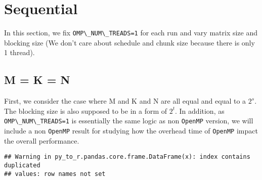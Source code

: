 \documentclass[
  12pt,
  xcolor = usenames,dvipsnames]{article}
\newcommand{\passthrough}[1]{#1}
\begin{document}
\begin{table}[!h]
\centering
{}
\end{table}

\hypertarget{sequential}{%
\section{Sequential}\label{sequential}}

In this section, we fix \passthrough{\lstinline!OMP\_NUM\_TREADS=1!} for each run and vary matrix size and blocking size (We don't care about schedule and chunk size because there is only 1 thread).

\hypertarget{m-k-n}{%
\subsection{M = K = N}\label{m-k-n}}

First, we consider the case where M and K and N are all equal and equal to a \(2^s\). The blocking size is also supposed to be in a form of \(2^t\). In addition, as \passthrough{\lstinline!OMP\_NUM\_TREADS=1!} is essentially the same logic as non \passthrough{\lstinline!OpenMP!} version, we will include a non \passthrough{\lstinline!OpenMP!} result for studying how the overhead time of \passthrough{\lstinline!OpenMP!} impact the overall performance.

\begin{lstlisting}
## Warning in py_to_r.pandas.core.frame.DataFrame(x): index contains duplicated
## values: row names not set
\end{lstlisting}
\end{document}
